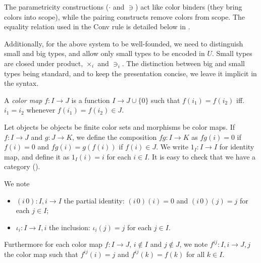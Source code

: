 \documentclass[english]{PaperTools/latex/lipics}
\def\pI{\ensuremath{\mathbf{pI}}}
\begin{document}
The parametricity constructions ($·$ and $∋$) act like color
binders (they bring colors into scope), while the pairing constructs
remove colors from scope.
The equality relation used in the {\sc Conv} rule is detailed below in .

Additionally, for the above system to be well-founded, we need to
distinguish small and big types, and allow only small types to be
encoded in $U$. Small types are closed under product, $×_i$ and
$∋_i$. The distinction between big and small types being standard, and
to keep the presentation concise, we leave it implicit in the syntax.

\begin{definition}
  A \emph{color map} $f : I → J$ is a function $I → J ∪ \{0\}$ such that
  $f(i_1) = f(i_2)$ iff. $i_1 = i_2$ whenever $f(i_1) = f(i_2) ∈ J$.
%
%
\end{definition}

\begin{definition}[Category $\pI{}$]
  \label{def:pI}
  Let objects be objects be finite color sets
  and morphisms be color maps.
  If $f : I → J$ and $g : J → K$, we define the composition $fg : I → K$
  as $fg(i) = 0$ if $f(i) = 0$ and $fg(i) = g(f(i))$ if $f(i) ∈ J$.
  We write $1_I : I → I$ for identity map, and define it as $1_I(i) = i$ for each $i ∈ I$.
  It is easy to check that we have a category (\cite[ex.~9.7 p.~176]{PittsAM:nomsns}).
\end{definition}

We note
\begin{itemize}
\item $(i\,0) : I,i → I$ the partial identity: $(i\,0)(i) = 0$ and $(i\,0)(j) = j$ for each $j ∈ I$; 
\item $ι_i : I → I,i$ the inclusion: $ι_i(j) = j$ for each $j ∈ I$.
\end{itemize}
Furthermore for each color map $f : I → J$, $i ∉ I$ and $j ∉ J$, we
note $f^{ij} : I,i → J,j$ the color map such that
$f^{ij}(i) = j$ and $f^{ij}(k) = f(k)$ for all $k ∈ I$.
\end{document}
